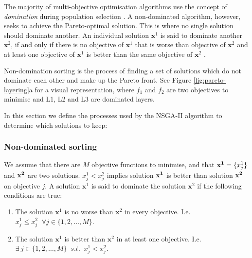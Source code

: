 \documentclass[sigconf]{acmart}
\begin{document}
The majority of multi-objective optimisation algorithms use the concept of \emph{domination} during population selection \cite{Burke2014}. A non-dominated algorithm, however, seeks to achieve the Pareto-optimal solution. This is where no single solution should dominate another. An individual solution $\mathbf{x}^{1}$ is said to dominate another $\mathbf{x}^{2}$, if and only if there is no objective of $\mathbf{x}^{1}$ that is worse than objective of $\mathbf{x}^{2}$ and at least one objective of $\mathbf{x}^{1}$ is better than the same objective of $\mathbf{x}^{2}$ \cite{Bao2017}. 


Non-domination sorting is the process of finding a set of solutions which do not dominate each other and make up the Pareto front. See Figure \ref{fig:pareto-layering}a for a visual representation, where $f_1$ and $f_2$ are two objectives to minimise and L1, L2 and L3 are dominated layers.


In this section we define the processes used by the NSGA-II algorithm to determine which solutions to keep:
\subsubsection{Non-dominated sorting}
We assume that there are $M$ objective functions to minimise, and that ${\bf x^{1}} = \{x_j^{1}\}$ and $\bf x^{2}$ are two solutions. $x_j^{1}<x_j^{2}$ implies solution $\bf x^{1}$ is better than solution $\bf x^{2}$ on objective $j$. A solution $\mathbf{x}^{1}$ is said to dominate the solution $\mathbf{x}^{2}$ if the following conditions are true:
\begin{enumerate}
  \item The solution $\mathbf{x}^{1}$ is no worse than $\mathbf{x}^{2}$ in every objective. I.e. $x^{1}_j \leq x^{2}_j \;\;  \forall j \in\{1,2,\ldots,M\}$.
  \item The solution $\mathbf{x}^{1}$ is better than $\mathbf{x}^{2}$ in at least one objective. I.e. $\exists\  {j}\in \{ 1,2,\ldots,M\} \;\; s.t. \;\;x^{1}_j < x^{2}_j$.
\end{enumerate}
\end{document}
